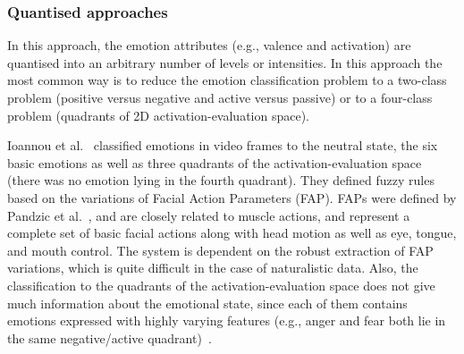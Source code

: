 \documentclass[10pt,journal,cspaper,compsoc]{IEEEtran}
\begin{document}
\subsubsection{Quantised approaches}

In this approach, the emotion attributes (e.g., valence and activation) are quantised into an arbitrary number of levels or intensities. In this approach the most common way is to reduce the emotion classification problem to a two-class problem (positive versus negative and active versus passive) or to a four-class problem (quadrants of 2D activation-evaluation space).

Ioannou et al.~\cite{Ioannou05} classified emotions in video frames to the neutral state, the six basic emotions as well as three quadrants of the activation-evaluation space (there was no emotion lying in the fourth quadrant). They defined fuzzy rules based on the variations of Facial Action Parameters (FAP). FAPs were defined by Pandzic et al.~\cite{Pandzic02}, and are closely related to muscle actions, and represent a complete set of basic facial actions along with head motion as well as eye, tongue, and mouth control. The system is dependent on the robust extraction of FAP variations, which is quite difficult in the case of naturalistic data. Also, the classification to the quadrants of the activation-evaluation space does not give much information about the emotional state, since each of them contains emotions expressed with highly varying features (e.g., anger and fear both lie in the same negative/active quadrant)~\cite{karpouzis2007modeling}.
\end{document}
